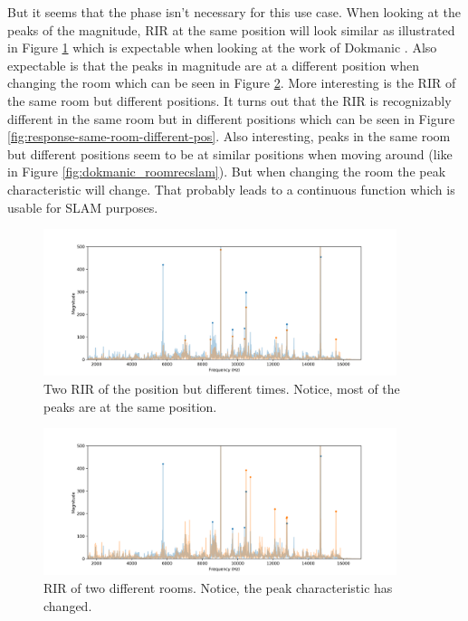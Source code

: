 But it seems that the phase isn't necessary for this use case. When looking at the peaks of the magnitude, RIR at the same position will look similar as illustrated in Figure \ref{fig:response-same-room-same-pos} which is expectable when looking at the work of Dokmanic \cite{dokmanic_roomrecslam_2016}. Also expectable is that the peaks in magnitude are at a different position when changing the room which can be seen in Figure \ref{fig:response-different-room}. More interesting is the RIR of the same room but different positions. It turns out that the RIR is recognizably different in the same room but in different positions which can be seen in Figure \ref{fig:response-same-room-different-pos}. Also interesting, peaks in the same room but different positions seem to be at similar positions when moving around (like in Figure \ref{fig:dokmanic_roomrecslam}). But when changing the room the peak characteristic will change. That probably leads to a continuous function which is usable for SLAM purposes.

\begin{figure}[h!]
	\centering
	\includegraphics[width=0.92\textwidth]{images/response-same-room-same-pos.png}
	\caption{
		Two RIR of the position but different times. Notice, most of the peaks are at the same position.
	}
	\label{fig:response-same-room-same-pos}
\end{figure}

\begin{figure}[h!]
	\centering
	\includegraphics[width=0.92\textwidth]{images/response-different-room.png}
	\caption{
		RIR of two different rooms. Notice, the peak characteristic has changed.
	}
	\label{fig:response-different-room}
\end{figure}

